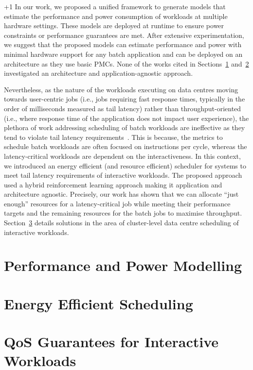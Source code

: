 \looseness +1 In our work, we proposed a unified framework to generate models that
estimate the performance and power consumption of workloads at multiple hardware settings.
These models are deployed at runtime to ensure power constraints or performance guarantees
are met.  After extensive experimentation, we suggest that the proposed models can 
estimate performance and power with minimal hardware support for any batch application and
can be deployed on an architecture as they use basic PMCs.  None of the works cited in
Sections~\ref{sec: powerperfawaremodels} and~\ref{sec: ef technique} investigated an
architecture and application-agnostic approach. 

Nevertheless, as the nature of the workloads executing on data centres moving towards
user-centric jobs (i.e., jobs requiring fast response times, typically in the order of
milliseconds measured as tail latency) rather than throughput-oriented (i.e., where
response time of the application does not impact user experience), the plethora of work
addressing scheduling of batch workloads are ineffective as they tend to violate tail
latency requirements~\citep{Lo:2016:IRE:2912575.2882783}. This is because, the metrics to
schedule batch workloads are often focused on instructions per cycle, whereas the
latency-critical workloads are dependent on the interactiveness. In this
context, we introduced an energy efficient (and resource efficient) scheduler for \muc
systems to meet tail latency requirements of interactive workloads. The proposed approach
used a hybrid reinforcement learning approach making it application and architecture
agnostic.  Precisely, our work has shown that we can allocate ``just enough'' resources
for a latency-critical job while meeting their performance targets and the remaining
resources for the batch jobs to maximise throughput.  Section~\ref{sec: hipster-related}
details solutions in the area of cluster-level data centre scheduling of interactive
workloads. 


\section{Performance and Power Modelling} 
\label{sec: powerperfawaremodels}




\section{Energy Efficient Scheduling} 
\label{sec: ef technique}



\section{QoS Guarantees for Interactive Workloads} 
\label{sec: hipster-related}




